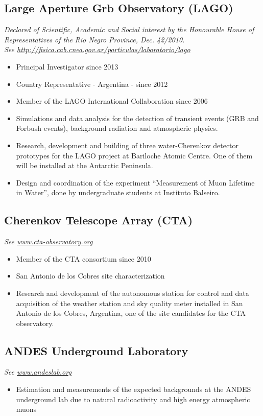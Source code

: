 \subsection*{Large Aperture Grb Observatory (LAGO)}
{\emph{Declared of Scientific, Academic and Social interest by the Honourable
House of Representatives of the Rio Negro Province, Dec. 42/2010.}}\\
{\small{\textit{See
\href{http://fisica.cab.cnea.gov.ar/particulas/laboratorio/lago}
{http://fisica.cab.cnea.gov.ar/particulas/laboratorio/lago}}}}\\
\begin{itemize}
\item Principal Investigator since 2013
\item Country Representative - Argentina - since 2012
\item Member of the LAGO International Collaboration since 2006
\item Simulations and data analysis for the detection of transient events
(GRB and Forbush events), background radiation and atmospheric physics.
\item Research, development and building of three water-Cherenkov detector
prototypes for the LAGO project at Bariloche Atomic Centre. One of them will be
installed at the Antarctic Peninsula.
\item Design and coordination of the experiment ``Measurement of Muon Lifetime in
Water'', done by undergraduate students at Instituto Balseiro.
\end{itemize}

\subsection*{Cherenkov Telescope Array (CTA)}
{\small{\textit{See \href{http://www.cta-observatory.org}{www.cta-observatory.org}}}}
\begin{itemize}
\item Member of the CTA consortium since 2010
\item San Antonio de los Cobres site characterization
\item Research and development of the autonomous station for control and data
acquisition of the weather station and sky quality meter installed in San
Antonio de los Cobres, Argentina, one of the site candidates for the CTA
observatory.
\end{itemize}

\subsection*{ANDES Underground Laboratory}
{\small{\textit{See \href{http://www.andeslab.org}{www.andeslab.org}}}}
\begin{itemize}
\item Estimation and measurements of the expected backgrounds at the ANDES
underground lab due to natural radioactivity and high energy atmospheric muons
\end{itemize}

